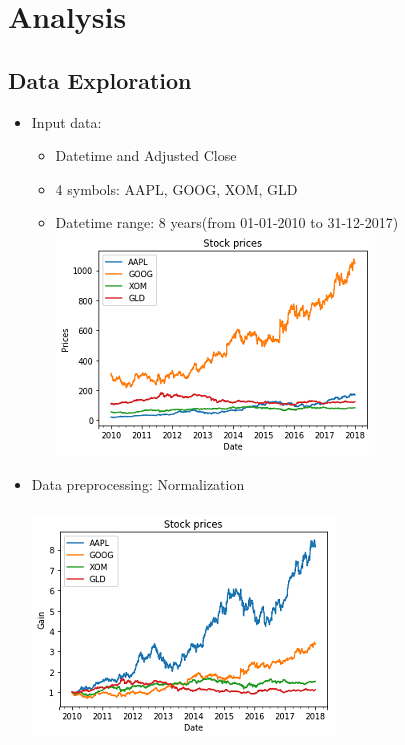 \documentclass[11pt]{article}
\makeatletter
\def\maxwidth{\ifdim\Gin@nat@width>\linewidth\linewidth
    \else\Gin@nat@width\fi}
\let\Oldincludegraphics\includegraphics
\renewcommand{\includegraphics}[1]{\Oldincludegraphics[width=.8\maxwidth]{#1}}
\providecommand{\tightlist}{%
      \setlength{\itemsep}{0pt}\setlength{\parskip}{0pt}}
\makeatother
\begin{document}
\section{Analysis}\label{analysis}

\subsection{Data Exploration}\label{data-exploration}

\begin{itemize}
\tightlist
\item
  Input data:

  \begin{itemize}
  \tightlist
  \item
    Datetime and Adjusted Close
  \item
    4 symbols: AAPL, GOOG, XOM, GLD
  \item
    Datetime range: 8 years(from 01-01-2010 to 31-12-2017) \\
    \includegraphics{./figures/2.jpg}
  \end{itemize}
\item
  Data preprocessing: Normalization \\ \\
  \includegraphics{./figures/3.jpg}
\end{itemize}
\end{document}
